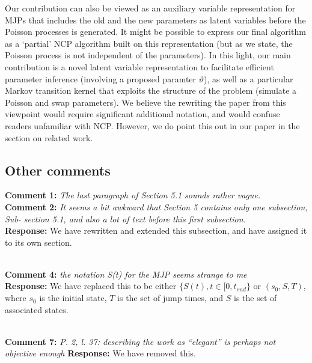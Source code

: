 \documentclass[11pt]{article}
\newcommand{\rev}[2]{\textbf{Comment #1: }\emph{#2}}
\newcommand{\resp}{\textbf{Response: }}
\begin{document}
Our contribution can also be viewed as an auxiliary variable representation for MJPs that includes the old and the new parameters as latent variables before the Poisson processes is generated. 
It might be possible to express our final algorithm as a `partial' NCP algorithm built on this representation (but as we state, the Poisson process is not independent of the parameters). 
In this light, our main contribution is a novel latent variable representation to facilitate efficient parameter inference (involving a proposed paramter $\vartheta$), as well as a particular Markov transition kernel that exploits the structure of the problem (simulate a Poisson and swap parameters). We believe the rewriting the paper from this viewpoint would require significant additional notation, and would confuse readers unfamiliar with NCP. However, we do point this out in our paper in the section on related work.


\subsection*{Other comments}
\rev{1}{The last paragraph of Section 5.1 sounds rather vague.} \\ 
\rev{2}{It seems a bit awkward that Section 5 contains only one subsection, Sub- section 5.1, and also a lot of text before this first subsection.}\\ 
\resp We have rewritten and extended this subsection, and have assigned it to its own section.

~\\ 
\rev{4}{the notation S(t) for the MJP seems strange to me} \\
\resp We have replaced this to be either $\{S(t), t \in [0,t_{end}\}$ or $(s_0, S, T)$, where $s_0$ is the initial state, $T$ is the set of jump times, and $S$ is the set of associated states.

~\\
\rev{7}{P. 2, l. 37: describing the work as “elegant” is perhaps not objective enough}
\resp{We have removed this.}
\end{document}
